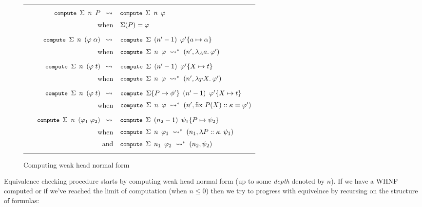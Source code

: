 \documentclass[english, mgr]{iithesis}
\renewcommand{\tt}[1]{\texttt{\small{#1}}}
\renewcommand{\it}[1]{\textit{#1}}
\newcommand{\fix}[3]{\ensuremath{\text{fix }#1(#2)\ofkind#3=}}\newcommand{\myatop}[2]{\ensuremath{\genfrac{}{}{0pt}{}{#1\hfill}{#2\hfill}}}
\begin{document}
\begin{figure}[htbp]
  \centering
\begin{tabularx}{\textwidth}{|rL|}
\hline & \\
$\tt{compute }\Sigma\tt{ }n\tt{ }P \;\:\leadsto$ &
$\tt{compute }\Sigma\tt{ }n\tt{ }\formphi$
\\
when & $\Sigma(P) = \varphi$
\\ & \\
$\tt{compute }\Sigma\tt{ }n\tt{ }{(\formphi \fAppAtom \atomexp )} \;\:\leadsto$ &
$\tt{compute }\Sigma\tt{ }(n' - 1)\tt{ }{\formphi'\subst{\atomv}{\atomexp}}$ \\
when & $\tt{compute }\Sigma\tt{ }n\tt{ }{\formphi} \;\leadsto^{*}\; (n',\fLamAtom{\atomv}\formphi')$
\\ & \\
$\tt{compute }\Sigma\tt{ }n\tt{ }{(\formphi \fAppTerm \term )}\;\:\leadsto$ &
$\tt{compute }\Sigma\tt{ }(n' - 1)\tt{ }\formphi'\subst{\termv}{\term}$ \\
when & $\tt{compute }\Sigma\tt{ }n\tt{ }{\formphi} \;\leadsto^{*}\; (n',\fLamTerm{\termv}\formphi')$
\\ & \\
$\tt{compute }\Sigma\tt{ }n\tt{ }{(\formphi \fAppTerm \term )}\;\:\leadsto$ &
$\tt{compute }\Sigma\subst{P}{\phi'}\tt{ }(n' - 1)\tt{ }{\formphi'\subst{\termv}{\term}}$\\
when & $\tt{compute }\Sigma\tt{ }n\tt{ }{\formphi} \;\leadsto^{*}\; (n',\fix{P}{\termv}{\kind}\formphi')$
\\ & \\
$\quad\tt{ compute }\Sigma\tt{ }n\tt{ }{(\formphi_1 \fApp \formphi_2 )}\;\:\leadsto$ &
$\tt{compute }\Sigma\tt{ }(n_2 - 1)\tt{ }{\psi_1\subst{\propv}{\psi_2}}$\\
when & $\tt{compute }\Sigma\tt{ }n\tt{ }{\formphi_1} \;\leadsto^{*}\; (n_1, \fLamForm{\propv}{\kind}{\psi_1})$\\
and & $\tt{compute }\Sigma\tt{ }n_1\tt{ }{\formphi_2} \;\leadsto^{*}\; (n_2, \psi_2)$
\\ & \\ \hline
\end{tabularx}
  \caption{Computing weak head normal form}
  \label{fig:compute}
\end{figure}
Equivalence checking procedure starts by computing weak head normal form (up to some \it{depth} denoted by $n$).
If we have a WHNF computed or if we've reached the limit of computation (when $ n \leqslant 0$) then we try to progress with equivelnce by recursing on the structure of formulas:
\end{document}
